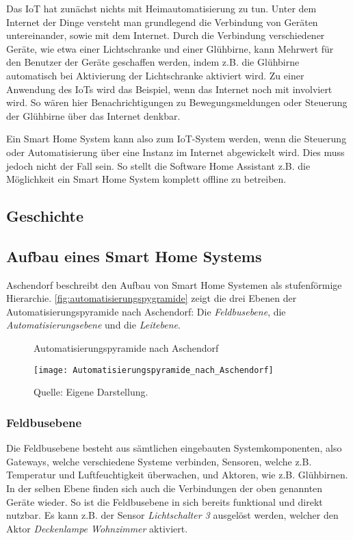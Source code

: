 Das \ac{IoT} hat zunächst nichts mit Heimautomatisierung zu tun.
Unter dem Internet der Dinge versteht man grundlegend die Verbindung von Geräten untereinander, sowie mit dem Internet.
Durch die Verbindung verschiedener Geräte, wie etwa einer Lichtschranke und einer Glühbirne, kann Mehrwert für den Benutzer der Geräte geschaffen werden, indem z.B. die Glühbirne automatisch bei Aktivierung der Lichtschranke aktiviert wird.
Zu einer Anwendung des \acp{IoT} wird das Beispiel, wenn das Internet noch mit involviert wird.
So wären hier Benachrichtigungen zu Bewegungsmeldungen oder Steuerung der Glühbirne über das Internet denkbar.

Ein Smart Home System kann also zum \ac{IoT}-System werden, wenn die Steuerung oder Automatisierung über eine Instanz im Internet abgewickelt wird.
Dies muss jedoch nicht der Fall sein.
So stellt die Software Home Assistant z.B. die Möglichkeit ein Smart Home System komplett offline zu betreiben.

\subsection{Geschichte}


\subsection{Aufbau eines Smart Home Systems}

Aschendorf beschreibt den Aufbau von Smart Home Systemen als stufenförmige Hierarchie.
\autoref{fig:automatisierungspygramide} zeigt die drei Ebenen der Automatisierungspyramide nach Aschendorf:
Die \textit{Feldbusebene}, die \textit{Automatisierungsebene} und die \textit{Leitebene}. 

\begin{figure}[ht]
	\centering
	\caption{Automatisierungspyramide nach Aschendorf}
	\texttt{[image: Automatisierungspyramide\_nach\_Aschendorf]}
	\caption*{\footnotesize{Quelle: Eigene Darstellung.}}
	\label{fig:automatisierungspygramide}
\end{figure}

\subsubsection{Feldbusebene}

Die Feldbusebene besteht aus sämtlichen eingebauten Systemkomponenten, also Gateways, welche verschiedene Systeme verbinden, Sensoren, welche z.B. Temperatur und Luftfeuchtigkeit überwachen, und Aktoren, wie z.B. Glühbirnen.
In der selben Ebene finden sich auch die Verbindungen der oben genannten Geräte wieder.
So ist die Feldbusebene in sich bereits funktional und direkt nutzbar.
Es kann z.B. der Sensor \textit{Lichtschalter 3} ausgelöst werden, welcher den Aktor \textit{Deckenlampe Wohnzimmer} aktiviert.

